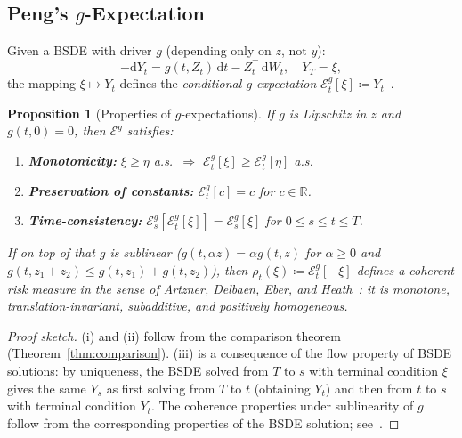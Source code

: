 \documentclass[11pt]{article}
\newtheorem{proposition}[theorem]{Proposition}
\theoremstyle{definition}
\theoremstyle{remark}
\newcommand{\R}{\mathbb{R}}
\newcommand{\dt}{\,\mathrm{d}t}
\newcommand{\dW}{\,\mathrm{d}W}
\begin{document}
\subsection{Peng's $g$-Expectation}

Given a BSDE with driver $g$ (depending only on $z$, not $y$):
\begin{equation}\label{eq:g_bsde}
  -\mathrm{d}Y_t = g(t, Z_t)\dt - Z_t^\top \dW_t, \quad Y_T = \xi,
\end{equation}
the mapping $\xi \mapsto Y_t$ defines the \emph{conditional $g$-expectation}
$\mathcal{E}^g_t[\xi] \coloneqq Y_t$~\cite{peng2004nonlinear,peng2019nonlinear}.

\begin{proposition}[Properties of $g$-expectations]\label{prop:g_properties}
If $g$ is Lipschitz in $z$ and $g(t, 0) = 0$, then $\mathcal{E}^g$ satisfies:
\begin{enumerate}[label=(\roman*)]
  \item \textbf{Monotonicity:} $\xi \ge \eta$ a.s.\ $\Longrightarrow$
  $\mathcal{E}^g_t[\xi] \ge \mathcal{E}^g_t[\eta]$ a.s.
  \item \textbf{Preservation of constants:} $\mathcal{E}^g_t[c] = c$ for
  $c \in \R$.
  \item \textbf{Time-consistency:}
  $\mathcal{E}^g_s\!\left[\mathcal{E}^g_t[\xi]\right] = \mathcal{E}^g_s[\xi]$
  for $0 \le s \le t \le T$.
\end{enumerate}
If on top of that $g$ is sublinear ($g(t, \alpha z) = \alpha g(t, z)$ for
$\alpha \ge 0$ and $g(t, z_1 + z_2) \le g(t, z_1) + g(t, z_2)$), then
$\rho_t(\xi) \coloneqq \mathcal{E}^g_t[-\xi]$ defines a coherent risk measure
in the sense of Artzner, Delbaen, Eber, and Heath~\cite{artzner1999coherent}:
it is monotone, translation-invariant, subadditive, and positively homogeneous.
\end{proposition}

\begin{proof}[Proof sketch]
(i) and (ii) follow from the comparison theorem (Theorem~\ref{thm:comparison}).
(iii) is a consequence of the flow property of BSDE solutions: by uniqueness,
the BSDE solved from $T$ to $s$ with terminal condition $\xi$ gives the same
$Y_s$ as first solving from $T$ to $t$ (obtaining $Y_t$) and then from $t$ to
$s$ with terminal condition $Y_t$.  The coherence properties under sublinearity
of $g$ follow from the corresponding properties of the BSDE
solution; see~\cite[Chapter~7]{zhang2017backward}.
\end{proof}
\end{document}
